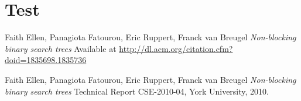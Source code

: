 \documentclass[a4paper]{article}
\begin{document}

\section{Test}
\label{sec:test}



\label{sec:conclusions}





\begin{thebibliography}{5}

 Faith Ellen, Panagiota Fatourou, Eric Ruppert, Franck van Breugel
\textit{Non-blocking binary search trees} Available at
\url{http://dl.acm.org/citation.cfm?doid=1835698.1835736}

 Faith Ellen, Panagiota Fatourou, Eric Ruppert, Franck van Breugel
\textit{Non-blocking binary search trees} Technical Report CSE-2010-04, York University, 2010.

\end{thebibliography}
\end{document}
